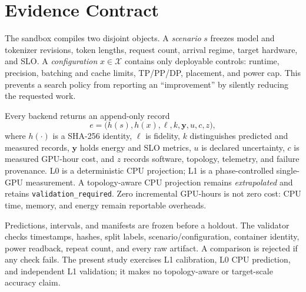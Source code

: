 \section{Evidence Contract}

The sandbox compiles two disjoint objects.  A \emph{scenario} $s$ freezes model
and tokenizer revisions, token lengths, request count, arrival regime, target
hardware, and SLO.  A \emph{configuration} $x\in\mathcal X$ contains only
deployable controls: runtime, precision, batching and cache limits, TP/PP/DP,
placement, and power cap.  This prevents a search policy from reporting an
``improvement'' by silently reducing the requested work.

Every backend returns an append-only record
\begin{equation}
e=\bigl(h(s),h(x),\ell,k,\mathbf y,u,c,z\bigr),
\end{equation}
where $h(\cdot)$ is a SHA-256 identity, $\ell$ is fidelity, $k$ distinguishes
predicted and measured records, $\mathbf y$ holds energy and SLO metrics, $u$
is declared uncertainty, $c$ is measured GPU-hour cost, and $z$ records
software, topology, telemetry, and failure provenance.  L0 is a deterministic
CPU projection; L1 is a phase-controlled single-GPU measurement.  A
topology-aware CPU projection remains \emph{extrapolated} and retains
\texttt{validation\_required}.  Zero incremental GPU-hours is not zero cost:
CPU time, memory, and energy remain reportable overheads.

Predictions, intervals, and manifests are frozen before a holdout.  The
validator checks timestamps, hashes, split labels, scenario/configuration,
container identity, power readback, repeat count, and every raw artifact.  A
comparison is rejected if any check fails.  The present study exercises L1
calibration, L0 CPU prediction, and independent L1 validation; it makes no
topology-aware or target-scale accuracy claim.
